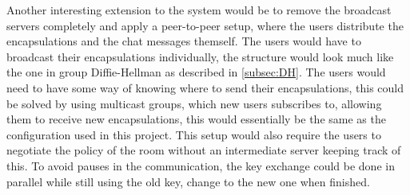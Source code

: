 Another interesting extension to the system would be to remove the broadcast servers completely and apply a peer-to-peer setup, where the users distribute the encapsulations and the chat messages themself. The users would have to broadcast their encapsulations individually, the structure would look much like the one in group Diffie-Hellman as described in \ref{subsec:DH}. The users would need to have some way of knowing where to send their encapsulations, this could be solved by using multicast groups, which new users subscribes to, allowing them to receive new encapsulations, this would essentially be the same as the configuration used in this project. This setup would also require the users to negotiate the policy of the room without an intermediate server keeping track of this. To avoid pauses in the communication, the key exchange could be done in parallel while still using the old key, change to the new one when finished. 

